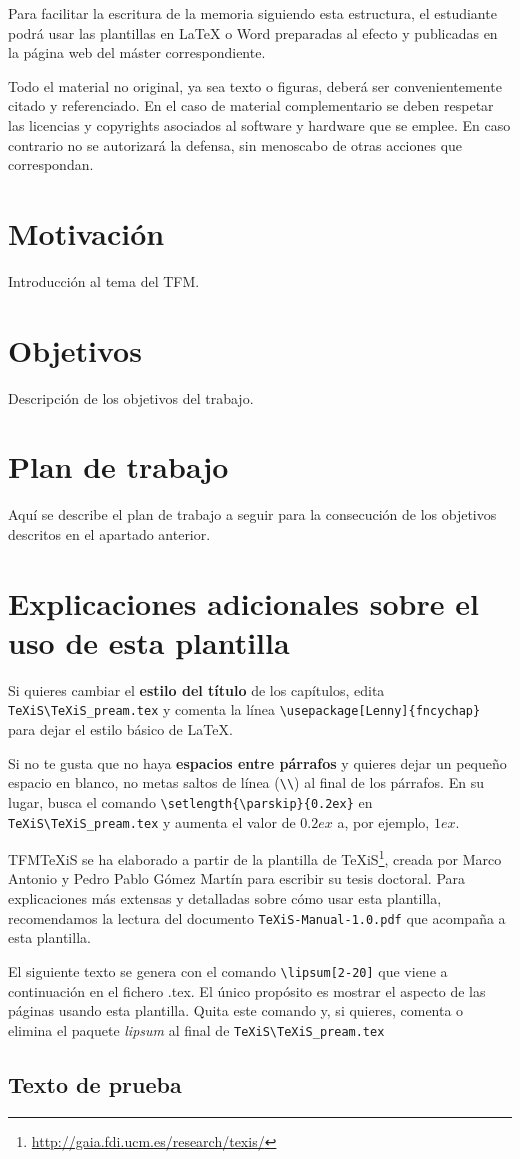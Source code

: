 Para facilitar la escritura de la memoria siguiendo esta estructura, el estudiante podrá usar las plantillas en LaTeX o Word preparadas al efecto y publicadas en la página web del máster correspondiente.

Todo el material no original, ya sea texto o figuras, deberá ser convenientemente citado y referenciado. En el caso de material complementario se deben respetar las licencias y copyrights asociados al software y hardware que se emplee. En caso contrario no se autorizará la defensa, sin menoscabo de otras acciones que correspondan.


\section{Motivación}
Introducción al tema del TFM.


\section{Objetivos}
Descripción de los objetivos del trabajo.


\section{Plan de trabajo}
Aquí se describe el plan de trabajo a seguir para la consecución de los objetivos descritos en el apartado anterior.



\section{Explicaciones adicionales sobre el uso de esta plantilla}
Si quieres cambiar el \textbf{estilo del título} de los capítulos, edita \verb|TeXiS\TeXiS_pream.tex| y comenta la línea \verb|\usepackage[Lenny]{fncychap}| para dejar el estilo básico de \LaTeX.

Si no te gusta que no haya \textbf{espacios entre párrafos} y quieres dejar un pequeño espacio en blanco, no metas saltos de línea (\verb|\\|) al final de los párrafos. En su lugar, busca el comando  \verb|\setlength{\parskip}{0.2ex}| en \verb|TeXiS\TeXiS_pream.tex| y aumenta el valor de $0.2ex$ a, por ejemplo, $1ex$.

TFMTeXiS se ha elaborado a partir de la plantilla de TeXiS\footnote{\url{http://gaia.fdi.ucm.es/research/texis/}}, creada por Marco Antonio y Pedro Pablo Gómez Martín para escribir su tesis doctoral. Para explicaciones más extensas y detalladas sobre cómo usar esta plantilla, recomendamos la lectura del documento \texttt{TeXiS-Manual-1.0.pdf} que acompaña a esta plantilla.

El siguiente texto se genera con el comando \verb|\lipsum[2-20]| que viene a continuación en el fichero .tex. El único propósito es mostrar el aspecto de las páginas usando esta plantilla. Quita este comando y, si quieres, comenta o elimina el paquete \textit{lipsum} al final de \verb|TeXiS\TeXiS_pream.tex|

\subsection{Texto de prueba}


\lipsum[2-20]